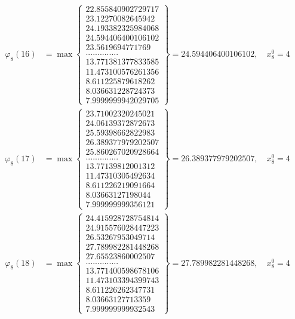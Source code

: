 \documentclass{article}
\begin{document}
\begin{align*}
  
  
  
\varphi_{8}(16) &= \max \left\{ \begin{array}{c}
22.855840902729717 \\
 23.12270082645942 \\
 24.193382325984068 \\
 24.594406400106102 \\
 23.5619694771769 \\
 .............. \\
 13.771381377833585 \\
 11.473100576261356 \\
 8.611225879618262 \\
 8.036631228724373 \\
 7.9999999942029705
\end{array} \right\} = 24.594406400106102, \quad x_{8}^0 = 4\\
  
  
  
  
\varphi_{8}(17) &= \max \left\{ \begin{array}{c}
23.71002320245021 \\
 24.06139372872673 \\
 25.59398662822983 \\
 26.389377979202507 \\
 25.860267020928664 \\
 .............. \\
 13.77139812001312 \\
 11.47310305492634 \\
 8.611226219091664 \\
 8.03663127198044 \\
 7.999999999356121
\end{array} \right\} = 26.389377979202507, \quad x_{8}^0 = 4\\
  
  
  
  
\varphi_{8}(18) &= \max \left\{ \begin{array}{c}
24.415928728754814 \\
 24.915576028447223 \\
 26.53267953049714 \\
 27.789982281448268 \\
 27.65523860002507 \\
 .............. \\
 13.771400598678106 \\
 11.473103394399743 \\
 8.611226262347731 \\
 8.03663127713359 \\
 7.999999999932543
\end{array} \right\} = 27.789982281448268, \quad x_{8}^0 = 4\\
  

\end{align*}
\end{document}
